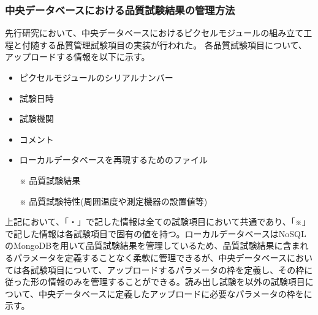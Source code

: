 \subsubsection{中央データベースにおける品質試験結果の管理方法}

先行研究において、中央データベースにおけるピクセルモジュールの組み立て工程と付随する品質管理試験項目の実装が行われた。
各品質試験項目について、アップロードする情報を以下に示す。
\begin{itemize}
  \item ピクセルモジュールのシリアルナンバー
  \item 試験日時
  \item 試験機関
  \item コメント
  \item ローカルデータベースを再現するためのファイル
  \item[※] 品質試験結果
  \item[※] 品質試験特性(周囲温度や測定機器の設置値等)
\end{itemize}
上記において、「・」で記した情報は全ての試験項目において共通であり、「※」で記した情報は各試験項目で固有の値を持つ。ローカルデータベースはNoSQLのMongoDBを用いて品質試験結果を管理しているため、品質試験結果に含まれるパラメータを定義することなく柔軟に管理できるが、中央データベースにおいては各試験項目について、アップロードするパラメータの枠を定義し、その枠に従った形の情報のみを管理することができる。読み出し試験を以外の試験項目について、中央データベースに定義したアップロードに必要なパラメータの枠をに示す。

